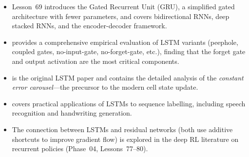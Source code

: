\documentclass[11pt,a4paper]{article}
\begin{document}
\begin{itemize}
  \item Lesson~69 introduces the Gated Recurrent Unit (GRU), a
    simplified gated architecture with fewer parameters, and covers
    bidirectional RNNs, deep stacked RNNs, and the encoder-decoder
    framework.
  \item \citet{greff2017} provides a comprehensive empirical
    evaluation of LSTM variants (peephole, coupled gates,
    no-input-gate, no-forget-gate, etc.), finding that the
    forget gate and output activation are the most critical
    components.
  \item \citet{hochreiter1997} is the original LSTM paper and
    contains the detailed analysis of the \emph{constant error
    carousel}---the precursor to the modern cell state update.
  \item \citet{graves2012} covers practical applications of
    LSTMs to sequence labelling, including speech recognition
    and handwriting generation.
  \item The connection between LSTMs and residual networks
    (both use additive shortcuts to improve gradient flow)
    is explored in the deep RL literature on recurrent policies
    (Phase~04, Lessons~77--80).
\end{itemize}


\end{document}
